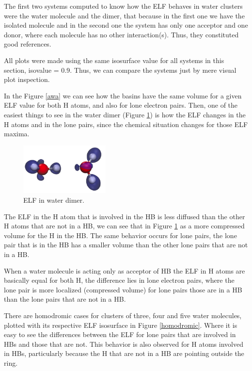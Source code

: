 The first two systems computed to know how the ELF behaves in water clusters
were the water molecule and the dimer, that because in the first one we have
the isolated molecule and in the second one the system has only one acceptor
and one donor, where each molecule has no other interaction(s). Thus, they
constituted good references.

All plots were made using the same isosurface value for all systems in this
section, isovalue = 0.9. Thus, we can compare the systems just by mere visual
plot inspection.

In the Figure \ref{awa} we can see how the basins have the same volume for a
given ELF value for both H atoms, and also for lone electron pairs. Then, one
of the easiest things to see in the water dimer (Figure \ref{dimer}) is how the
ELF changes in the H atoms and in the lone pairs, since the chemical situation
changes for those ELF maxima.

\begin{figure}
  \centering
  \includegraphics[width=0.4\textwidth]{4/plots/elf/new/dimerELF.png}
  \caption{ELF in water dimer.}
  \label{dimer}
\end{figure}

The ELF in the H atom that is involved in the HB is less diffused than the
other H atoms that are not in a HB, we can see that in Figure \ref{dimer} as a
more compressed volume for the H in the HB.  The same behavior occurs for lone
pairs, the lone pair that is in the HB has a smaller volume than the other lone
pairs that are not in a HB.

When a water molecule is acting only as acceptor of HB the ELF in H atoms are
basically equal for both H, the difference lies in lone electron pairs, where
the lone pair is more localized (compressed volume) for lone pairs those are in
a HB than the lone pairs that are not in a HB.

There are homodromic cases for clusters of three, four and five water
molecules, plotted with its respective ELF isosurface in Figure
\ref{homodromic}.  Where it is easy to see the differences between the ELF for
lone pairs that are involved in HBs and those that are not. This behavior is
also observed for H atoms involved in HBs, particularly because the H that are
not in a HB are pointing outside the ring.

